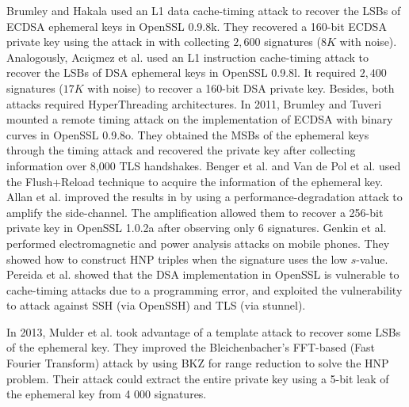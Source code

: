 Brumley and Hakala \cite{Brumley2009} used an L1 data cache-timing attack to recover the LSBs of ECDSA ephemeral keys in OpenSSL 0.9.8k.
 They recovered a 160-bit ECDSA private key using the attack in \cite{HG2001} with collecting $2,600$ signatures ($8K$ with noise).
Analogously, Ac{\i}i{\c{c}}mez et al. \cite{Brumley2010} used an L1 instruction cache-timing attack to recover the LSBs of DSA ephemeral keys in OpenSSL 0.9.8l.
 It required $2,400$ signatures ($17K$ with noise) to recover a 160-bit DSA private key.
 Besides, both attacks required HyperThreading architectures.
In 2011, Brumley and Tuveri \cite{Brumley2011} mounted a remote timing attack on the implementation of ECDSA with binary curves in OpenSSL 0.9.8o.
 They obtained the MSBs of the ephemeral keys through the timing attack and recovered the private key after collecting information over 8,000 TLS handshakes.
Benger et al. \cite{Benger2014} and Van de Pol et al. \cite{Van2015} used the Flush+Reload technique to acquire the information of the ephemeral key.
Allan et al. \cite{Allan2016} improved the  results in \cite{Van2015} by using a performance-degradation attack to amplify the side-channel. The amplification allowed them to recover a 256-bit private key in OpenSSL 1.0.2a after observing only 6 signatures.
Genkin et al. \cite{Genkin2016} performed electromagnetic and power analysis attacks on mobile phones.
 They showed how to construct HNP triples when the signature uses the low $s$-value.
Pereida et al. \cite{Pereida2016} showed that the DSA implementation in OpenSSL is vulnerable to cache-timing attacks due to a programming error,
 and exploited the vulnerability to attack against SSH (via OpenSSH) and TLS (via stunnel).

In 2013, Mulder et al. \cite{Mulder2013} took advantage of a template attack to recover some LSBs of the ephemeral key.
They improved the Bleichenbacher’s FFT-based (Fast Fourier Transform) attack by using BKZ for range reduction to solve the HNP problem.
Their attack could extract the entire private key using a 5-bit leak of the ephemeral key from 4 000 signatures.




